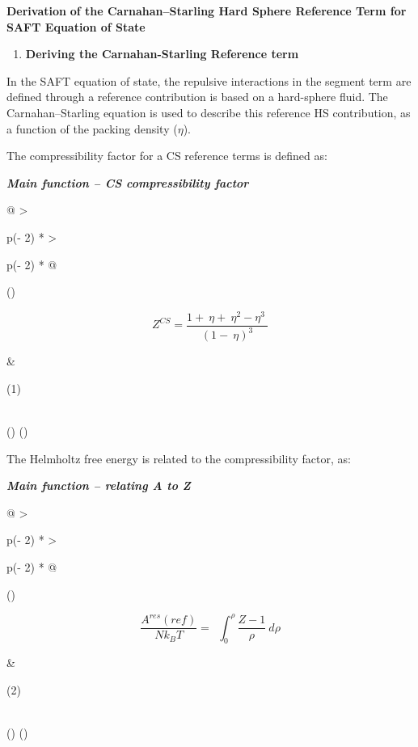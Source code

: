 \documentclass[
]{article}
\author{}
\date{}
\begin{document}
\textbf{Derivation} \textbf{of the Carnahan--Starling Hard Sphere
Reference Term for SAFT Equation of State}

\begin{enumerate}
\def\labelenumi{\arabic{enumi}.}
\item
  \textbf{Deriving the Carnahan-Starling Reference term}
\end{enumerate}

In the SAFT equation of state, the repulsive interactions in the segment
term are defined through a reference contribution is based on a
hard-sphere fluid. The Carnahan--Starling equation is used to describe
this reference HS contribution, as a function of the packing density
(\(\eta\)).

The compressibility factor for a CS reference terms is defined as:

\emph{\textbf{Main function -- CS compressibility factor}}

\begin{longtable}[]{@{}
  >{\raggedright\arraybackslash}p{(\columnwidth - 2\tabcolsep) * }
  >{\raggedright\arraybackslash}p{(\columnwidth - 2\tabcolsep) * }@{}}
\toprule()
\begin{minipage}[b]{\linewidth}\raggedright
\[Z^{CS} = \frac{1 + \ \eta + \ \eta^{2} - \eta^{3}\ }{(1 - \ \eta)^{3}}\]
\end{minipage} & \begin{minipage}[b]{\linewidth}\raggedright
(1)
\end{minipage} \\
\midrule()
\endhead
\bottomrule()
\end{longtable}

The Helmholtz free energy is related to the compressibility factor, as:

\emph{\textbf{Main function -- relating A to Z}}

\begin{longtable}[]{@{}
  >{\raggedright\arraybackslash}p{(\columnwidth - 2\tabcolsep) * }
  >{\raggedright\arraybackslash}p{(\columnwidth - 2\tabcolsep) * }@{}}
\toprule()
\begin{minipage}[b]{\linewidth}\raggedright
\[\frac{A^{res}(ref)}{Nk_{B}T} = \ \ \int_{0}^{\rho}{\frac{Z - 1}{\rho}\ d\rho}\]
\end{minipage} & \begin{minipage}[b]{\linewidth}\raggedright
(2)
\end{minipage} \\
\midrule()
\endhead
\bottomrule()
\end{longtable}
\end{document}
